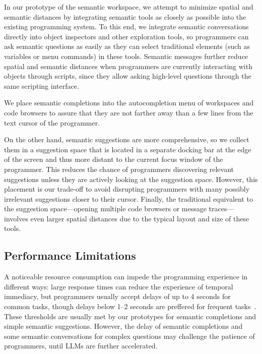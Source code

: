 In our prototype of the semantic workspace, we attempt to minimize spatial and semantic distances by integrating semantic tools as closely as possible into the existing programming system.
To this end, we integrate semantic conversations directly into object inspectors and other exploration tools, so programmers can ask semantic questions as easily as they can select traditional elements (such as variables or menu commands) in these tools.
Semantic messages further reduce spatial and semantic distances when programmers are currently interacting with objects through scripts, since they allow asking high-level questions through the same scripting interface.

We place semantic completions into the autocompletion menu of workspaces and code browsers to assure that they are not farther away than a few lines from the text cursor of the programmer.

On the other hand, semantic suggestions are more comprehensive, so we collect them in a suggestion space that is located in a separate docking bar at the edge of the screen and thus more distant to the current focus window of the programmer.
This reduces the chance of programmers discovering relevant suggestions unless they are actively looking at the suggestion space.
However, this placement is our trade-off to avoid disrupting programmers with many possibly irrelevant suggestions closer to their cursor.
Finally, the traditional equivalent to the suggestion space---opening multiple code browsers or message traces---involves even larger spatial distances due to the typical layout and size of these tools.

\subsection*{Performance Limitations}
\label{sec:discussion/experience/performance}

A noticeable resource consumption can impede the programming experience in different ways:
large response times can reduce the experience of temporal immediacy, but programmers usually accept delays of up to 4 seconds for common tasks, though delays below 1--2 seconds are preffered for frequent tasks~\cite[p.~473]{shneiderman2005designing}.
These thresholds are usually met by our prototypes for semantic completions and simple semantic suggestions.
However, the delay of semantic completions and some semantic conversations for complex questions may challenge the patience of programmers, until LLMs are further accelerated.

